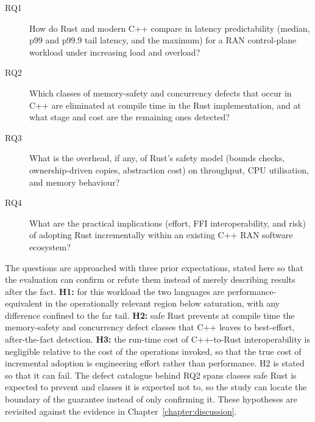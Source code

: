 \documentclass[english,twoside,openright,a4paper,censored,csm,software-track-2020]{HYthesisML}
\begin{document}
\begin{description}
  \item[RQ1] How do Rust and modern C++ compare in latency predictability (median, p99
        and p99.9 tail latency, and the maximum) for a RAN control-plane workload under
        increasing load and overload?
  \item[RQ2] Which classes of memory-safety and concurrency defects that occur in C++ are
        eliminated at compile time in the Rust implementation, and at what stage and cost
        are the remaining ones detected?
  \item[RQ3] What is the overhead, if any, of Rust's safety model (bounds checks,
        ownership-driven copies, abstraction cost) on throughput, CPU utilisation, and
        memory behaviour?
  \item[RQ4] What are the practical implications (effort, FFI interoperability, and risk)
        of adopting Rust incrementally within an existing C++ RAN software ecosystem?
\end{description}

The questions are approached with three prior expectations, stated here so that the evaluation
can confirm or refute them instead of merely describing results after the fact. \textbf{H1:} for
this workload the two languages are performance-equivalent in the operationally relevant region
below saturation, with any difference confined to the far tail. \textbf{H2:} safe Rust prevents
at compile time the memory-safety and concurrency defect classes that C++ leaves to
best-effort, after-the-fact detection. \textbf{H3:} the run-time cost of C++-to-Rust
interoperability is negligible relative to the cost of the operations invoked, so that the true
cost of incremental adoption is engineering effort rather than performance. H2 is stated so that
it can fail. The defect catalogue behind RQ2 spans classes safe Rust is expected to prevent and
classes it is expected not to, so the study can locate the boundary of the guarantee instead of
only confirming it. These hypotheses are revisited against the evidence in
Chapter~\ref{chapter:discussion}.
\end{document}

